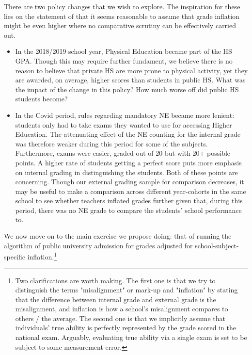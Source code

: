 \documentclass{article}
\begin{document}
There are two policy changes that we wish to explore. The inspiration for these lies on the statement of \cite{nata2014unfairness} that it seems reasonable to assume that grade inflation might be even higher where no comparative scrutiny can be effectively carried out.

\begin{itemize}
    \item In the 2018/2019 school year, Physical Education became part of the HS GPA. Though this may require further fundament, we believe there is no reason to believe that private HS are more prone to physical activity, yet %
    they are awarded, on average, higher scores than students in public HS. What was the impact of the change in this policy? How much worse off did public HS students become?
    \item In the Covid period, rules regarding mandatory NE became more lenient: students only had to take exams they wanted to use for accessing Higher Education. The attenuating effect of the NE counting for the internal grade was therefore weaker during this period for some of the subjects. Furthermore, exams were easier, graded out of 20 but with 20+ possible points. A higher rate of students getting a perfect score puts more emphasis on internal grading in distinguishing the students. Both of these points are concerning. Though our external grading sample for comparison decreases, it may be useful to make a comparison across different year-cohorts in the same school to see whether teachers inflated grades further given that, during this period, there was no NE grade to compare the students' school performance to.
\end{itemize}


We now move on to the main exercise we propose doing: that of running the algorithm of public university admission for grades adjusted for school-subject-specific inflation.\footnote{Two clarifications are worth making. The first one is that we try to distinguish the terms "misalignment" or mark-up and "inflation" by stating that the difference between internal grade and external grade is the misalignment, and inflation is how a school's misalignment compares to others / the average. The second one is that we implicitly assume that individuals' true ability is perfectly represented by the grade scored in the national exam. Arguably, evaluating true ability via a single exam is set to be subject to some measurement error. %
}
\end{document}

